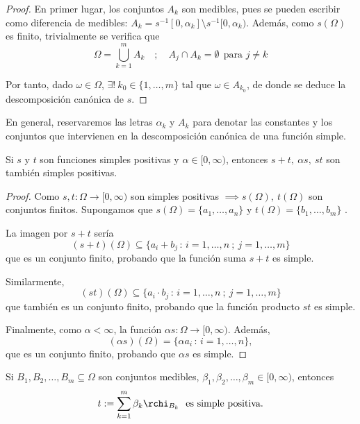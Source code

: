 \begin{proof} En primer lugar, los conjuntos $A_k$ son medibles, pues se pueden escribir como diferencia de medibles: \mbox{$A_k = s^{-1}[0,\alpha_k]\setminus s^{-1}[0,\alpha_k)$.} Además, como $s(\Omega)$ es finito, trivialmente se verifica que $$\Omega = \bigcup_{k=1}^m A_k \quad ; \quad A_j \cap A_k = \emptyset \ \ \text{para } j \ne k$$

  Por tanto, dado $\omega \in \Omega$, $\exists ! \ k_0 \in \{1,\dots,m\} \text{ tal que } \omega \in A_{k_0}$, de donde se deduce la descomposición canónica de $s$.
\end{proof}

En general, reservaremos las letras $\alpha_k$ y $A_k$ para denotar las constantes y los conjuntos que intervienen en la descomposición canónica de una función simple.


\begin{nprop} \label{propsimples}
  Si $s$ y $t$ son funciones simples positivas y $\alpha \in [0,\infty)$, entonces $s+t, \ \alpha s, \ st$ son también simples positivas.
\end{nprop}

  \begin{proof}
    Como $s,t: \Omega \longrightarrow [0,\infty)$ son simples positivas $\implies s(\Omega) , \ t(\Omega)$ son conjuntos finitos. Supongamos que $s(\Omega) =\{ a_1, \dots ,a_n\}$  y $t(\Omega) = \{ b_1, \dots ,b_m\}$ .

    La imagen por $s+ t$ sería
    $$(s+t)(\Omega) \subseteq \{ a_i + b_j \, :\, i=1,\dots ,n \ ; \ j=1,\dots ,m\}$$
    que es un conjunto finito, probando que la función suma $s+t$ es simple.

    Similarmente, $$(st)(\Omega ) \subseteq \{ a_i \cdot b_j \, : \, i=1,\dots ,n \ ; \ j=1,\dots ,m \}$$
    que también es un conjunto finito, probando que la función producto $st$ es simple.

    Finalmente, como $\alpha< \infty$, la función $\alpha s:\Omega \longrightarrow [0,\infty)$. Además,
    $$(\alpha s)(\Omega) = \{ \alpha a_i \,:\, i=1,\dots ,n \},$$
    que es un  conjunto finito, probando que $\alpha s$ es simple.
  \end{proof}

\begin{nprop} \label{caract_simples}
Si $B_1, B_2,\dots ,B_m \subseteq \Omega$ son conjuntos medibles,
$\beta_1,\beta_2,\dots,\beta_m \in[0,\infty)$, entonces $$t:= \sum_{k=1}^{m}  \beta_k \rchi_{B_k} \ \ \text{es simple positiva.}$$
\end{nprop}


